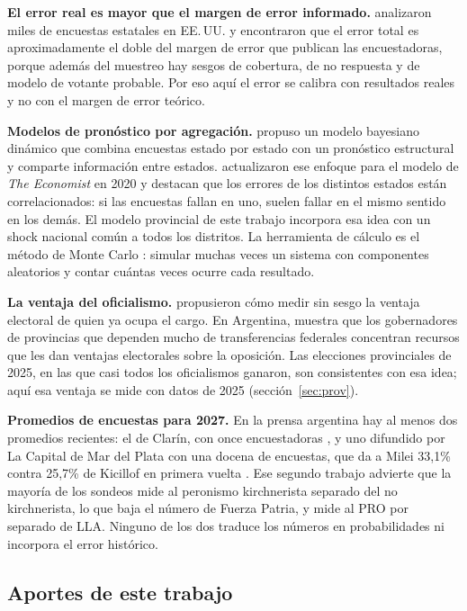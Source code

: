 \documentclass{article}
\begin{document}
\textbf{El error real es mayor que el margen de error informado.}
\citet{shirani2018} analizaron miles de encuestas estatales en EE.\,UU. y
encontraron que el error total es aproximadamente el doble del margen de error
que publican las encuestadoras, porque además del muestreo hay sesgos de
cobertura, de no respuesta y de modelo de votante probable. Por eso aquí el
error se calibra con resultados reales y no con el margen de error teórico.

\textbf{Modelos de pronóstico por agregación.} \citet{linzer2013} propuso un
modelo bayesiano dinámico que combina encuestas estado por estado con un
pronóstico estructural y comparte información entre estados.
\citet{heidemanns2020} actualizaron ese enfoque para el modelo de \emph{The
Economist} en 2020 y destacan que los errores de los distintos estados están
correlacionados: si las encuestas fallan en uno, suelen fallar en el mismo
sentido en los demás. El modelo provincial de este trabajo incorpora esa idea
con un shock nacional común a todos los distritos. La herramienta de cálculo es
el método de Monte Carlo \cite{metropolis1949}: simular muchas veces un sistema
con componentes aleatorios y contar cuántas veces ocurre cada resultado.

\textbf{La ventaja del oficialismo.} \citet{gelman1990} propusieron cómo medir
sin sesgo la ventaja electoral de quien ya ocupa el cargo. En Argentina,
\citet{gervasoni2010} muestra que los gobernadores de provincias que dependen
mucho de transferencias federales concentran recursos que les dan ventajas
electorales sobre la oposición. Las elecciones provinciales de 2025, en las que
casi todos los oficialismos ganaron, son consistentes con esa idea; aquí esa
ventaja se mide con datos de 2025 (sección~\ref{sec:prov}).

\textbf{Promedios de encuestas para 2027.} En la prensa argentina hay al menos
dos promedios recientes: el de Clarín, con once encuestadoras
\cite{clarin2026}, y uno difundido por La Capital de Mar del Plata con una
docena de encuestas, que da a Milei 33,1\% contra 25,7\% de Kicillof en primera
vuelta \cite{lacapital2026}. Ese segundo trabajo advierte que la mayoría de los
sondeos mide al peronismo kirchnerista separado del no kirchnerista, lo que baja
el número de Fuerza Patria, y mide al PRO por separado de LLA. Ninguno de los dos
traduce los números en probabilidades ni incorpora el error histórico.

\subsection{Aportes de este trabajo}
\end{document}
